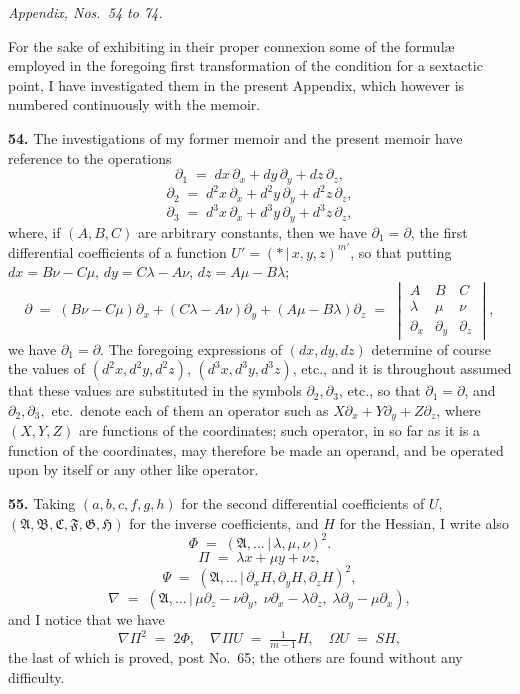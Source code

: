 \documentclass[11pt,a4paper]{article}
\providecommand{\mid}{\,|\,}
\begin{document}
\bigskip

\begin{center}
\textit{Appendix, Nos.\ 54 to 74.}
\end{center}

For the sake of exhibiting in their proper connexion some of the formul{\ae} employed in the foregoing first transformation of the condition for a sextactic point, I have investigated them in the present Appendix, which however is numbered continuously with the memoir.

\medskip

\textbf{54.} The investigations of my former memoir and the present memoir have reference to the operations
\[
\partial_1 \;=\; dx\,\partial_x + dy\,\partial_y + dz\,\partial_z,
\]
\[
\partial_2 \;=\; d^2 x\,\partial_x + d^2 y\,\partial_y + d^2 z\,\partial_z,
\]
\[
\partial_3 \;=\; d^3 x\,\partial_x + d^3 y\,\partial_y + d^3 z\,\partial_z,
\]
where, if $(A,B,C)$ are arbitrary constants, then we have $\partial_1 = \partial$, the first differential coefficients of a function $U' = (*\mid x,y,z)^{m'}$, so that putting $dx = B\nu - C\mu$, $dy = C\lambda - A\nu$, $dz = A\mu - B\lambda$;
\[
\partial \;=\; (B\nu - C\mu)\partial_x + (C\lambda - A\nu)\partial_y + (A\mu - B\lambda)\partial_z \;=\; \begin{vmatrix} A & B & C \\ \lambda & \mu & \nu \\ \partial_x & \partial_y & \partial_z \end{vmatrix},
\]
we have $\partial_1 = \partial$. The foregoing expressions of $(dx,dy,dz)$ determine of course the values of $(d^2 x, d^2 y, d^2 z)$, $(d^3 x, d^3 y, d^3 z)$, etc., and it is throughout assumed that these values are substituted in the symbols $\partial_2,\partial_3$, etc., so that $\partial_1 = \partial$, and $\partial_2,\partial_3,$ etc.\ denote each of them an operator such as $X\partial_x + Y\partial_y + Z\partial_z$, where $(X,Y,Z)$ are functions of the coordinates; such operator, in so far as it is a function of the coordinates, may therefore be made an operand, and be operated upon by itself or any other like operator.

\medskip

\textbf{55.} Taking $(a,b,c,f,g,h)$ for the second differential coefficients of $U$, $(\mathfrak{A},\mathfrak{B},\mathfrak{C},\mathfrak{F},\mathfrak{G},\mathfrak{H})$ for the inverse coefficients, and $H$ for the Hessian, I write also
\[
\Phi \;=\; (\mathfrak{A},\ldots\mid \lambda,\mu,\nu)^2.
\]
\[
\Pi \;=\; \lambda x + \mu y + \nu z,
\]
\[
\Psi \;=\; (\mathfrak{A},\ldots\mid \partial_x H,\partial_y H,\partial_z H)^2,
\]
\[
\nabla \;=\; (\mathfrak{A},\ldots\mid \mu\partial_z - \nu\partial_y,\;\nu\partial_x - \lambda\partial_z,\;\lambda\partial_y - \mu\partial_x),
\]
and I notice that we have
\[
\nabla\Pi^2 \;=\; 2\Phi,\quad \nabla\Pi U \;=\; \tfrac{1}{m-1}H,\quad \Omega U \;=\; SH,
\]
the last of which is proved, post No.~65; the others are found without any difficulty.
\end{document}
